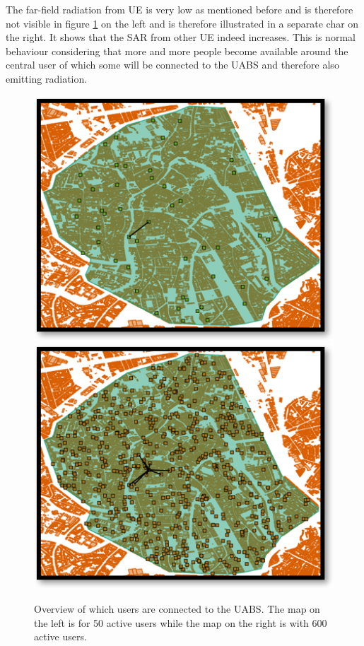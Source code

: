 The far-field radiation from \gls{UE} is very low as mentioned before and is therefore not visible in figure \ref{fig:connectionMap} 
on the left and is therefore illustrated in a separate char on the right. 
It shows that the \gls{SAR}  from other \gls{UE} indeed increases. This is normal 
behaviour considering that more and more people become available around the central user of which some will be connected to the \gls{UABS}
and therefore also emitting radiation.

\begin{figure}[!htb]
  \includegraphics[width=\linewidth]{../images/connectionsMap50Users.png}
\endminipage\hfill
{}%
  \includegraphics[width=\linewidth]{../images/connectionsMap600Users.png}
\endminipage
  \caption{Overview of which users are connected to the \gls{UABS}. The map on the left is for 50 active users while the map on the right is with 600 active users.}
  \label{fig:connectionMap}
\end{figure}

